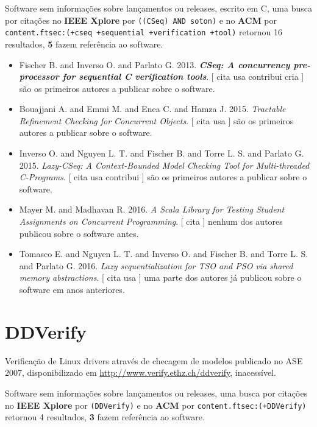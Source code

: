 Software sem informações sobre lançamentos ou releases,
escrito em C,
uma busca por citações no {\bf IEEE Xplore} por
\texttt{((CSeq) AND soton)}
e no {\bf ACM} por
\texttt{content.ftsec:(+cseq +sequential +verification +tool)}
retornou
16 resultados,
{\bf 5} fazem referência ao software.

\begin{itemize}
\item Fischer B. and Inverso O. and Parlato G.
      2013.
        \textbf{\textit{ CSeq: A concurrency pre-processor for sequential C verification tools}}.
      [
          cita
          usa
          contribui
          cria
      ]
são os primeiros autores a publicar sobre o software.
\item Bouajjani A. and Emmi M. and Enea C. and Hamza J.
      2015.
        \textit{ Tractable Refinement Checking for Concurrent Objects}.
      [
          cita
          usa
      ]
são os primeiros autores a publicar sobre o software.
\item Inverso O. and Nguyen L. T. and Fischer B. and Torre L. S. and Parlato G.
      2015.
        \textit{ Lazy-CSeq: A Context-Bounded Model Checking Tool for Multi-threaded C-Programs}.
      [
          cita
          usa
          contribui
      ]
são os primeiros autores a publicar sobre o software.
\item Mayer M. and Madhavan R.
      2016.
        \textit{ A Scala Library for Testing Student Assignments on Concurrent Programming}.
      [
          cita
      ]
nenhum dos autores publicou sobre o software antes.
\item Tomasco E. and Nguyen L. T. and Inverso O. and Fischer B. and Torre L. S. and Parlato G.
      2016.
        \textit{ Lazy sequentialization for TSO and PSO via shared memory abstractions}.
      [
          cita
          usa
      ]
uma parte dos autores já publicou sobre o software em anos anteriores.
\end{itemize}
\section{DDVerify}

Verificação de Linux drivers através de checagem de modelos
publicado no ASE 2007,
disponibilizado em \url{http://www.verify.ethz.ch/ddverify},
inacessível.

Software sem informações sobre lançamentos ou releases,
uma busca por citações no {\bf IEEE Xplore} por
\texttt{(DDVerify)}
e no {\bf ACM} por
\texttt{content.ftsec:(+DDVerify)}
retornou
4 resultados,
{\bf 3} fazem referência ao software.

